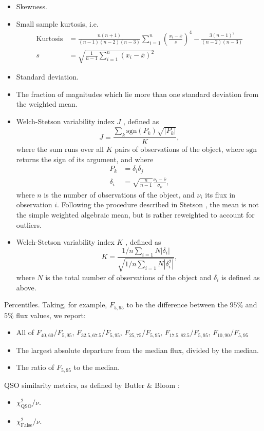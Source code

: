 \documentclass[DM,authoryear,toc]{lsstdoc}
\begin{document}
\begin{displayquote}
\begin{itemize}
\item{Skewness.}
\item{Small sample kurtosis, i.e.
\begin{align}
\mathrm{Kurtosis} &= \frac{n(n+1)}{(n-1)(n-2)(n-3)} \sum_{i=1}^{n} \left(\frac{x_i - \overline{x}}{s}\right)^4 -\frac{3(n-1)^2}{(n-2)(n-3)} \\
s &= \sqrt{\frac{1}{n-1} \sum_{i=1}^{n}(x_i - \overline{x})^2}
\end{align}
}
\item{Standard deviation.}
\item{The fraction of magnitudes which lie more than one standard deviation from the weighted mean.}
\item{Welch-Stetson variability index $J$ \cite{1996PASP..108..851S}, defined as
\[
J = \frac{\sum_{k} \mathrm{sgn}(P_k) \sqrt{|P_k|}}{K},
\]
where the sum runs over all $K$ pairs of observations of the object, where $\mathrm{sgn}$ returns the sign of its argument, and where
\begin{align}
P_k &= \delta_i \delta_j \\
\delta_i &= \sqrt{\frac{n}{n-1}}\frac{\nu_i - \overline{\nu}}{\sigma_{\nu}},
\end{align}
where $n$ is the number of observations of the object, and $\nu_i$ its flux in observation $i$. Following the procedure described in Stetson \cite{1996PASP..108..851S}, the mean is not the simple weighted algebraic mean, but is rather reweighted to account for outliers.}
\item{Welch-Stetson variability index $K$ \cite{1996PASP..108..851S}, defined as
\[
K = \frac{1/n \sum_{i=1}{N}|\delta_i|}{\sqrt{1/n \sum_{i=1}{N}|\delta_i^2|}},
\]
where $N$ is the total number of observations of the object and $\delta_i$ is defined as above.}
\end{itemize}

Percentiles. Taking, for example, $F_{5,95}$ to be the difference between the $95\%$ and $5\%$ flux values, we report:

\begin{itemize}
\item{All of $F_{40,60} / F_{5,95}$, $F_{32.5,67.5} / F_{5,95}$, $F_{25,75} / F_{5,95}$, $F_{17.5,82.5} / F_{5,95}$, $F_{10,90} / F_{5,95}$}
\item{The largest absolute departure from the median flux, divided by the
median.}
\item{The ratio of $F_{5,95}$ to the median.}
\end{itemize}

QSO similarity metrics, as defined by Butler \& Bloom \cite{2011AJ....141...93B}:

\begin{itemize}
\item{$\chi_{\mathrm{QSO}}^2 / \nu$.}
\item{$\chi_{\mathrm{False}}^2 / \nu$.}
\end{itemize}


\end{displayquote}
\end{document}
